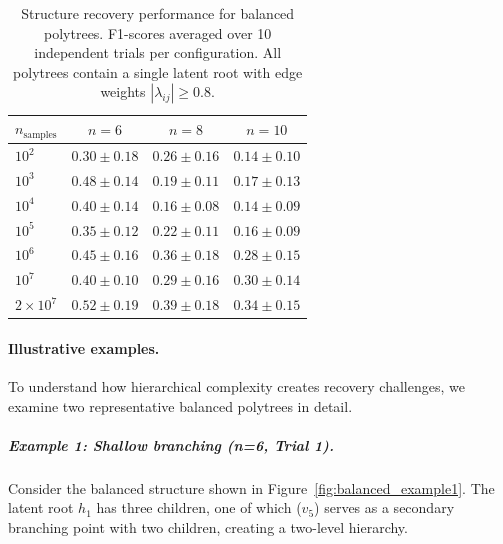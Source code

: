 \documentclass[11pt,a4paper]{article}
\numberwithin{equation}{section}
\begin{document}
\begin{table}[h]
\centering
\caption{Structure recovery performance for balanced polytrees. F1-scores averaged over 10 independent trials per configuration. All polytrees contain a single latent root with edge weights $|\lambda_{ij}| \geq 0.8$.}
\label{tab:balanced_performance}
\begin{tabular}{lccc}
\toprule
$n_{\text{samples}}$ & $n=6$ & $n=8$ & $n=10$ \\
\midrule
$10^2$ & $0.30 \pm 0.18$ & $0.26 \pm 0.16$ & $0.14 \pm 0.10$ \\
$10^3$ & $0.48 \pm 0.14$ & $0.19 \pm 0.11$ & $0.17 \pm 0.13$ \\
$10^4$ & $0.40 \pm 0.14$ & $0.16 \pm 0.08$ & $0.14 \pm 0.09$ \\
$10^5$ & $0.35 \pm 0.12$ & $0.22 \pm 0.11$ & $0.16 \pm 0.09$ \\
$10^6$ & $0.45 \pm 0.16$ & $0.36 \pm 0.18$ & $0.28 \pm 0.15$ \\
$10^7$ & $0.40 \pm 0.10$ & $0.29 \pm 0.16$ & $0.30 \pm 0.14$ \\
$2 \times 10^7$ & $0.52 \pm 0.19$ & $0.39 \pm 0.18$ & $0.34 \pm 0.15$ \\
\bottomrule
\end{tabular}
\end{table}

\paragraph{Illustrative examples.} To understand how hierarchical complexity creates recovery challenges, we examine two representative balanced polytrees in detail.

\subparagraph{Example 1: Shallow branching (n=6, Trial 1).} Consider the balanced structure shown in Figure~\ref{fig:balanced_example1}. The latent root $h_1$ has three children, one of which ($v_5$) serves as a secondary branching point with two children, creating a two-level hierarchy.
\end{document}
